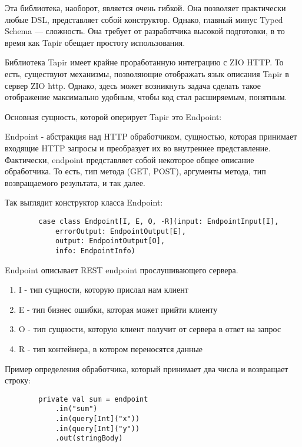 \documentclass[14pt]{extarticle}
\begin{document}
    Эта библиотека, наоборот, является очень гибкой. Она позволяет практически любые DSL, представляет собой конструктор.
    Однако, главный минус Typed Schema --- сложность. Она требует от разработчика
    высокой подготовки, в то время как Tapir обещает простоту использования.

    Библиотека Tapir имеет крайне проработанную интеграцию с ZIO HTTP. То есть, существуют механизмы, позволяющие
    отображать язык описания Tapir в сервер ZIO http. Однако, здесь может возникнуть задача сделать такое отображение
    максимально удобным, чтобы код стал расширяемым, понятным.

    Основная сущность, которой оперирует Tapir это Endpoint:

    Endpoint - абстракция над HTTP обработчиком, сущностью, которая принимает входящие HTTP запросы и преобразует их
    во внутреннее представление. Фактически, endpoint представляет собой
    некоторое общее описание обработчика. То есть, тип метода (GET, POST), аргументы метода, тип возвращаемого результата, и так далее.

    Так выглядит конструктор класса Endpoint:

    \begin{verbatim}
        case class Endpoint[I, E, O, -R](input: EndpointInput[I],
            errorOutput: EndpointOutput[E],
            output: EndpointOutput[O],
            info: EndpointInfo)
    \end{verbatim}

    Endpoint описывает REST endpoint прослушивающего сервера.
    \begin{enumerate}
        \item I - тип сущности, которую прислал нам клиент
        \item E - тип бизнес ошибки, которая может прийти клиенту
        \item O - тип сущности, которую клиент получит от сервера в ответ на запрос
        \item R - тип контейнера, в котором переносятся данные
    \end{enumerate}

    Пример определения обработчика, который принимает два числа и возвращает строку:

    \begin{verbatim}
        private val sum = endpoint
            .in("sum")
            .in(query[Int]("x"))
            .in(query[Int]("y"))
            .out(stringBody)
    \end{verbatim}
\end{document}
